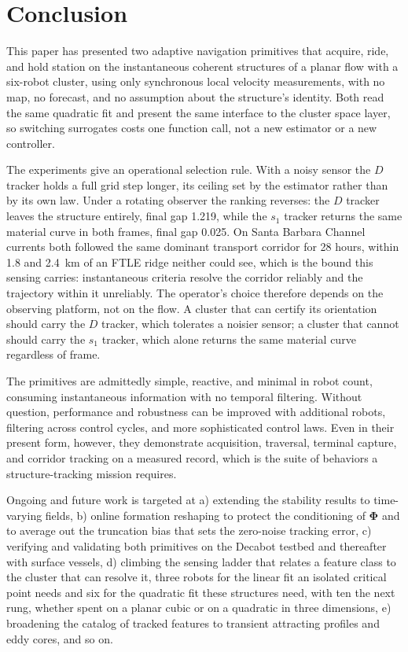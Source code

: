 \documentclass[lettersize,journal]{IEEEtran}
\begin{document}
\section{Conclusion}

This paper has presented two adaptive navigation primitives that
acquire, ride, and hold station on the instantaneous coherent
structures of a planar flow with a six-robot cluster, using only
synchronous local velocity measurements, with no map, no forecast, and
no assumption about the structure's identity. Both read the same
quadratic fit and present the same interface to the cluster space layer,
so switching surrogates costs one function call, not a
new estimator or a new controller.

The experiments give an operational selection rule. With a noisy sensor
the $D$ tracker holds a full grid step longer, its ceiling set by the
estimator rather than by its own law. Under a rotating observer the
ranking reverses: the $D$ tracker leaves the structure entirely, final
gap 1.219, while the $s_1$ tracker returns the same material curve in
both frames, final gap 0.025. On Santa Barbara Channel currents both
followed the same dominant transport corridor for 28 hours, within 1.8
and 2.4~km of an FTLE ridge neither could see, which is the bound this
sensing carries: instantaneous criteria resolve the corridor reliably
and the trajectory within it unreliably. The operator's choice
therefore depends on the observing platform, not on the flow. A cluster
that can certify its orientation should carry the $D$ tracker, which
tolerates a noisier sensor; a cluster that cannot should carry the
$s_1$ tracker, which alone returns the same material curve regardless
of frame.

The primitives are admittedly simple, reactive, and minimal in robot
count, consuming instantaneous information with no temporal filtering.
Without question, performance and robustness can be improved with
additional robots, filtering across control cycles, and more
sophisticated control laws. Even in their present form, however, they
demonstrate acquisition, traversal, terminal capture, and corridor
tracking on a measured record, which is the suite of behaviors a
structure-tracking mission requires.

Ongoing and future work is targeted at a) extending the stability
results to time-varying fields, b) online formation reshaping to
protect the conditioning of $\boldsymbol{\Phi}$ and to average out the
truncation bias that sets the zero-noise tracking error, c) verifying
and validating both primitives on the Decabot testbed and thereafter
with surface vessels, d) climbing the sensing ladder that relates a
feature class to the cluster that can resolve it, three robots for the
linear fit an isolated critical point needs \cite{8} and six for the
quadratic fit these structures need, with ten the next rung, whether
spent on a planar cubic or on a quadratic in three dimensions,
e) broadening the catalog of tracked features to transient attracting
profiles and eddy cores, and so on.
\end{document}
